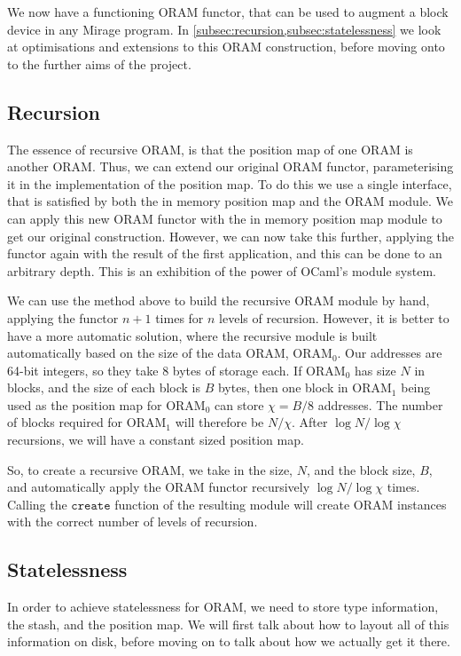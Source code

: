 \documentclass[12pt,a4paper,twoside,openright]{report}
\begin{document}
We now have a functioning ORAM functor, that can be used to augment a block device in any Mirage program. In \cref{subsec:recursion,subsec:statelessness} we look at optimisations and extensions to this ORAM construction, before moving onto to the further aims of the project.

\subsection{Recursion}
\label{subsec:recursion}

The essence of recursive ORAM, is that the position map of one ORAM is another ORAM. Thus, we can extend our original ORAM functor, parameterising it in the implementation of the position map. To do this we use a single interface, that is satisfied by both the in memory position map and the ORAM module. We can apply this new ORAM functor with the in memory position map module to get our original construction. However, we can now take this further, applying the functor again with the result of the first application, and this can be done to an arbitrary depth. This is an exhibition of the power of OCaml's module system.

We can use the method above to build the recursive ORAM module by hand, applying the functor $n + 1$ times for $n$ levels of recursion. However, it is better to have a more automatic solution, where the recursive module is built automatically based on the size of the data ORAM, ORAM$_0$. Our addresses are 64-bit integers, so they take 8 bytes of storage each. If ORAM$_0$ has size $N$ in blocks, and the size of each block is $B$ bytes, then one block in ORAM$_1$ being used as the position map for ORAM$_0$ can store $\chi = B / 8$ addresses. The number of blocks required for ORAM$_1$ will therefore be $N / \chi$. After $\log N / \log \chi$ recursions, we will have a constant sized position map.

So, to create a recursive ORAM, we take in the size, $N$, and the block size, $B$, and automatically apply the ORAM functor recursively $\log N / \log \chi$ times. Calling the $\mathtt{create}$ function of the resulting module will create ORAM instances with the correct number of levels of recursion.

\subsection{Statelessness}
\label{subsec:statelessness}

In order to achieve statelessness for ORAM, we need to store type information, the stash, and the position map. We will first talk about how to layout all of this information on disk, before moving on to talk about how we actually get it there.
\end{document}

